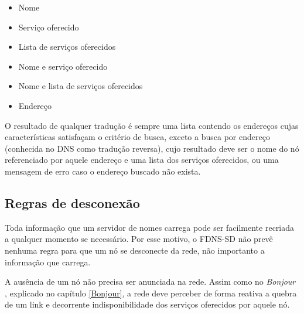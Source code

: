     \begin{itemize}
        \item Nome
        \item Serviço oferecido
        \item Lista de serviços oferecidos
        \item Nome e serviço oferecido
        \item Nome e lista de serviços oferecidos
        \item Endereço
    \end{itemize}
    
    O resultado de qualquer tradução é sempre uma lista contendo os endereços
    cujas características satisfaçam o critério de busca, exceto a busca por endereço
    (conhecida no DNS como tradução reversa), cujo resultado deve ser o nome do
    nó referenciado por aquele endereço e uma lista dos serviços oferecidos, ou
    uma mensagem de erro caso o endereço buscado não exista.
    
\subsection{Regras de desconexão}
    Toda informação que um servidor de nomes carrega pode ser facilmente recriada
    a qualquer momento se necessário. Por esse motivo, o FDNS-SD não prevê nenhuma
    regra para que um nó se desconecte da rede, não importanto a informação que
    carrega.
    
    A ausência de um nó não precisa ser anunciada na rede. Assim como no
    \textit{Bonjour} \cite{mdns}, explicado no capítulo \ref{Bonjour}, a rede
    deve perceber de forma reativa a quebra de um link e decorrente indisponibilidade
    dos serviços oferecidos por aquele nó.